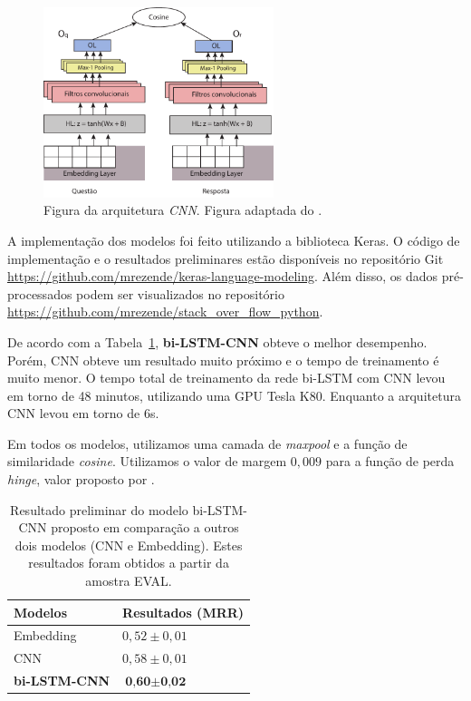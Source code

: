 \documentclass[12pt]{article}
\begin{document}
\begin{figure}[h]
    \centering
    \includegraphics[width=0.60\textwidth]{figures/ArquiteturaCNN.pdf}
    \caption{Figura da arquitetura \emph{CNN}. Figura adaptada do \cite{tan-lstm-qa}.}
    \label{fig:arquitetura-cnn}
\end{figure}

A implementação dos modelos foi feito utilizando a biblioteca Keras. O código de implementação e o resultados preliminares estão disponíveis no repositório Git \url{https://github.com/mrezende/keras-language-modeling}. Além disso, os dados pré-processados podem ser visualizados no repositório \url{https://github.com/mrezende/stack_over_flow_python}.

De acordo com a Tabela~\ref{table:resultados-preliminares}, \textbf{bi-LSTM-CNN} obteve o melhor desempenho. Porém, CNN obteve um resultado muito próximo e o tempo de treinamento é muito menor. O tempo total de treinamento da rede bi-LSTM com CNN levou em torno de 48 minutos, utilizando uma GPU Tesla K80. Enquanto a arquitetura CNN levou em torno de 6s. 

Em todos os modelos, utilizamos uma camada de \textit{maxpool} e a função de similaridade \textit{cosine}. Utilizamos o valor de margem $0,009$ para a função de perda \textit{hinge}, valor proposto por \cite{feng-answer-selection-2015}.


\begin{table}[h]
\centering
\begin{tabular}{ p{3cm} p{3cm} }
 \hline
 \textbf{Modelos} & \textbf{Resultados (MRR)}\\
 \hline
 Embedding & $0,52 \pm 0,01$\\
 
 CNN & $0,58 \pm 0,01 $ \\
 
 \textbf{bi-LSTM-CNN} & $\textbf{0,60} \pm \textbf{0,02}$\\
 \hline
\end{tabular}
\caption{Resultado preliminar do modelo bi-LSTM-CNN proposto em comparação a outros dois modelos (CNN e Embedding). Estes resultados foram obtidos a partir da amostra EVAL.}
\label{table:resultados-preliminares}
\end{table}
\end{document}
